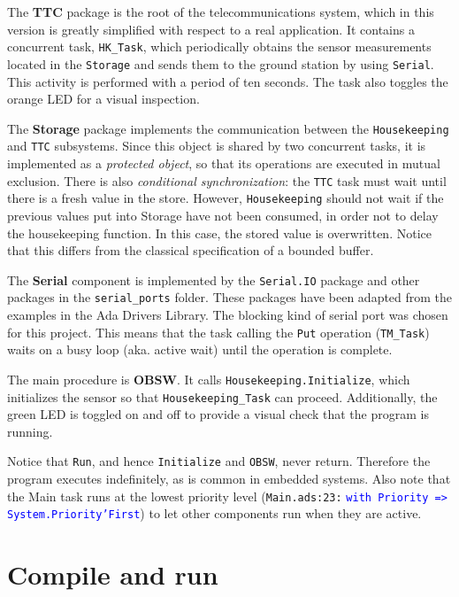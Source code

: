 The \textbf{TTC} package is the root of the telecommunications system, which in this version is greatly simplified with respect to a real application.
It contains a concurrent task,
\texttt{HK\_Task},
which periodically obtains the sensor measurements located in the \texttt{Storage} and sends them to the ground station by using \texttt{Serial}.
This activity is performed with a period of ten seconds.
The task also toggles the orange LED for a visual inspection.

The \textbf{Storage} package implements the communication between the \texttt{Housekeeping} and \texttt{TTC} subsystems. 
Since this object is shared by two concurrent tasks, it is implemented as a \textit{protected object},
so that its operations are executed in mutual exclusion.
There is also \textit{conditional synchronization}:
the \texttt{TTC} task must wait until there is a fresh value in the store.
However, \texttt{Housekeeping} should not wait if the previous values put into Storage have not been consumed, in order not to delay the housekeeping function.
In this case, the stored value is overwritten. Notice that this differs from the classical specification of a bounded buffer.

The \textbf{Serial} component is implemented by the \texttt{Serial.IO} package and other packages in the \textcolor{mPurple}{\texttt{serial\_ports}} folder.
These packages have been adapted from the examples in the Ada Drivers Library.
The blocking kind of serial port was chosen for this project.
This means that the task calling the \texttt{Put} operation (\texttt{TM\_Task}) waits on a busy loop (aka. active wait) until the operation is complete.

The main procedure is \textbf{OBSW}.
It calls \texttt{Housekeeping.Initialize},
which initializes the sensor so that \texttt{Housekeeping\_Task} can proceed.
Additionally, the green LED is toggled on and off to provide a visual check that the program is running.

Notice that \texttt{Run}, and hence \texttt{Initialize} and \texttt{OBSW}, never return. Therefore the program executes indefinitely, as is common in embedded systems.
Also note that the Main task runs at the lowest priority level
(\textcolor{mGreen}{\texttt{Main.ads:23:}} \textcolor{blue}{\texttt{with Priority => System.Priority'First}}) to let other components run when they are active.

\section{Compile and run}\label{sec:ass-2:compile-run}

